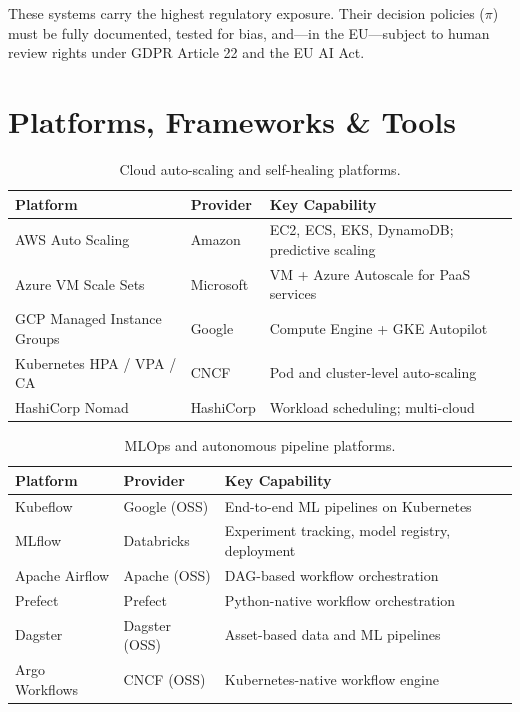\documentclass[12pt, a4paper]{article}
\begin{document}
These systems carry the highest regulatory exposure. Their decision policies ($\pi$) must be fully documented, tested for bias, and---in the EU---subject to human review rights under GDPR Article 22 and the EU AI Act.

\section{Platforms, Frameworks \& Tools}\label{sec:platforms}

\begin{table}[ht]
\centering
\caption{Cloud auto-scaling and self-healing platforms.}
\label{tab:platforms-cloud}
\begin{tabular}{lll}
\toprule
\textbf{Platform} & \textbf{Provider} & \textbf{Key Capability} \\
\midrule
AWS Auto Scaling                & Amazon   & EC2, ECS, EKS, DynamoDB; predictive scaling \\
Azure VM Scale Sets             & Microsoft & VM + Azure Autoscale for PaaS services \\
GCP Managed Instance Groups     & Google   & Compute Engine + GKE Autopilot \\
Kubernetes HPA / VPA / CA       & CNCF     & Pod and cluster-level auto-scaling \\
HashiCorp Nomad                 & HashiCorp & Workload scheduling; multi-cloud \\
\bottomrule
\end{tabular}
\end{table}

\begin{table}[ht]
\centering
\caption{MLOps and autonomous pipeline platforms.}
\label{tab:platforms-mlops}
\begin{tabular}{lll}
\toprule
\textbf{Platform} & \textbf{Provider} & \textbf{Key Capability} \\
\midrule
Kubeflow        & Google (OSS)   & End-to-end ML pipelines on Kubernetes \\
MLflow          & Databricks     & Experiment tracking, model registry, deployment \\
Apache Airflow  & Apache (OSS)   & DAG-based workflow orchestration \\
Prefect         & Prefect        & Python-native workflow orchestration \\
Dagster         & Dagster (OSS)  & Asset-based data and ML pipelines \\
Argo Workflows  & CNCF (OSS)     & Kubernetes-native workflow engine \\
\bottomrule
\end{tabular}
\end{table}
\end{document}
